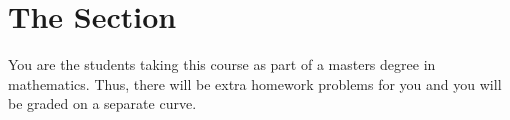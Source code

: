 \section*{The \sixhundredsection Section}

You are the students taking this course as part of a masters degree in mathematics. Thus, there will be extra homework problems for you and you will be graded on a separate curve.